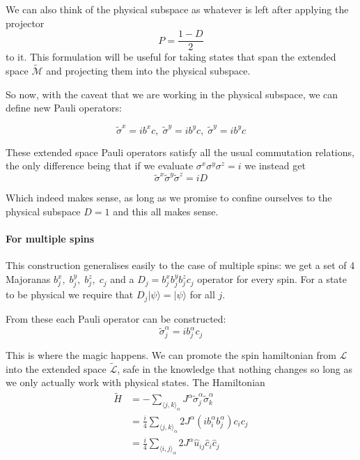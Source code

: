 We can also think of the physical subspace as whatever is left after applying the projector \[P  = \frac{1 - D}{2}\] to it. This formulation will be useful for taking states that span the extended space \(\mathcal{\tilde{M}}\) and projecting them into the physical subspace.

So now, with the caveat that we are working in the physical subspace, we can define new Pauli operators:

\[\tilde{\sigma}^x = i b^x c,\; \tilde{\sigma}^y = i b^y c,\; \tilde{\sigma}^y = i b^y c\]

These extended space Pauli operators satisfy all the usual commutation relations, the only difference being that if we evaluate \(\sigma^x \sigma^y \sigma^z = i\) we instead get \[ \tilde{\sigma}^x\tilde{\sigma}^y\tilde{\sigma}^z = iD \]

Which indeed makes sense, as long as we promise to confine ourselves to the physical subspace \(D = 1\) and this all makes sense.

\hypertarget{for-multiple-spins}{%
\paragraph{For multiple spins}\label{for-multiple-spins}}

This construction generalises easily to the case of multiple spins: we get a set of 4 Majoranas \(b^x_j,\; b^y_j,\;b^z_j,\; c_j\) and a \(D_j = b^x_jb^y_jb^z_jc_j\) operator for every spin. For a state to be physical we require that \(D_j |\psi\rangle = |\psi\rangle\) for all \(j\).

From these each Pauli operator can be constructed: \[\tilde{\sigma}^\alpha_j = i b^\alpha_j c_j\]

This is where the magic happens. We can promote the spin hamiltonian from \(\mathcal{L}\) into the extended space \(\mathcal{\tilde{L}}\), safe in the knowledge that nothing changes so long as we only actually work with physical states. The Hamiltonian \[\begin{aligned}
\tilde{H} &=  - \sum_{\langle j,k\rangle_\alpha} J^{\alpha}\tilde{\sigma}_j^{\alpha}\tilde{\sigma}_k^{\alpha}\\
          &= \frac{i}{4} \sum_{\langle j,k\rangle_\alpha} 2J^{\alpha} (ib^\alpha_i b^\alpha_j) c_i c_j\\
          &=  \frac{i}{4} \sum_{\langle i,j\rangle_\alpha} 2J^{\alpha} \hat{u}_{ij} \hat{c}_i \hat{c}_j
\end{aligned}\]

